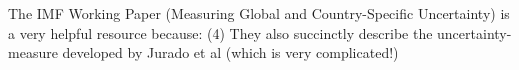 \documentclass[a4paper,11pt,listof=nochaptergap,oneside,pointednumbers,bibtotoc,bigheadings,liststotoc]{scrbook}
\begin{document}
\begin{table}[t]
\centering
\caption{Periods of high uncertainty according to macro uncertainty index h=1.}
\label{tab:macro_shocks}
\centering
\end{table}


The IMF Working Paper (Measuring Global and Country-Specific Uncertainty) is a very helpful resource because: (4) They also succinctly describe the uncertainty-measure developed by Jurado et al (which is very complicated!)
\end{document}
